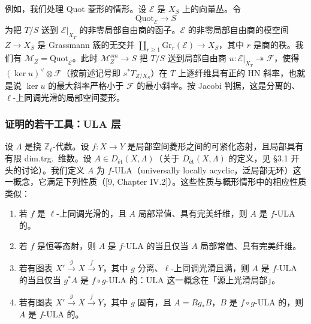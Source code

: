 例如，我们处理 Quot 菱形的情形。设 $\mathcal E$ 是 $X_S$ 上的向量丛。令
\[
\mathrm{Quot}_{\mathcal E}\longrightarrow S
\]
为把 $T/S$ 送到 $\mathcal E|_{X_T}$ 的非零局部自由商的函子。$\mathcal E$ 的非零局部自由商的模空间 $Z\to X_S$ 是 Grassmann 簇的无交并 $\coprod_{r\ge1}\mathrm{Gr}_r(\mathcal E)\to X_S$，其中 $r$ 是商的秩。我们有 $\mathcal M_Z=\mathrm{Quot}_{\mathcal E}$。此时 $\mathcal M_Z^{sm}\to S$ 把 $T/S$ 送到局部自由商 $u:\mathcal E|_{X_T}\twoheadrightarrow\mathcal F$，使得 $(\ker u)^\vee\otimes\mathcal F$（按前述记号即 $s^*T_{Z/X_S}$）在 $T$ 上逐纤维具有正的 HN 斜率，也就是说 $\ker u$ 的最大斜率严格小于 $\mathcal F$ 的最小斜率。按 Jacobi 判据，这是分离的、$\ell$-上同调光滑的局部空间菱形。

\subsubsection{证明的若干工具：ULA 层}

设 $\Lambda$ 是挠 $\mathbb Z_\ell$-代数。设 $f:X\to Y$ 是局部空间菱形之间的可紧化态射，且局部具有有限 dim.trg.\ 维数。设 $A\in D_{\text{ét}}(X,\Lambda)$（关于 $D_{\text{ét}}(X,\Lambda)$ 的定义，见 §3.1 开头的讨论）。我们定义 $A$ 为 $f$-ULA（universally locally acyclic，泛局部无环）这一概念，它满足下列性质（[9, Chapter IV.2]）。这些性质与概形情形中的相应性质类似：
\begin{enumerate}[label=(\arabic*),leftmargin=2.4em,itemsep=0.2em]
\item 若 $f$ 是 $\ell$-上同调光滑的，且 $A$ 局部常值、具有完美纤维，则 $A$ 是 $f$-ULA 的。
\item 若 $f$ 是恒等态射，则 $A$ 是 $f$-ULA 的当且仅当 $A$ 局部常值、具有完美纤维。
\item 若有图表 $X'\xrightarrow{g}X\xrightarrow{f}Y$，其中 $g$ 分离、$\ell$-上同调光滑且满，则 $A$ 是 $f$-ULA 的当且仅当 $g^*A$ 是 $f\circ g$-ULA 的：ULA 这一概念在「源上光滑局部」。
\item 若有图表 $X'\xrightarrow{g}X\xrightarrow{f}Y$，其中 $g$ 固有，且 $A=Rg_*B$，$B$ 是 $f\circ g$-ULA 的，则 $A$ 是 $f$-ULA 的。
\end{enumerate}

